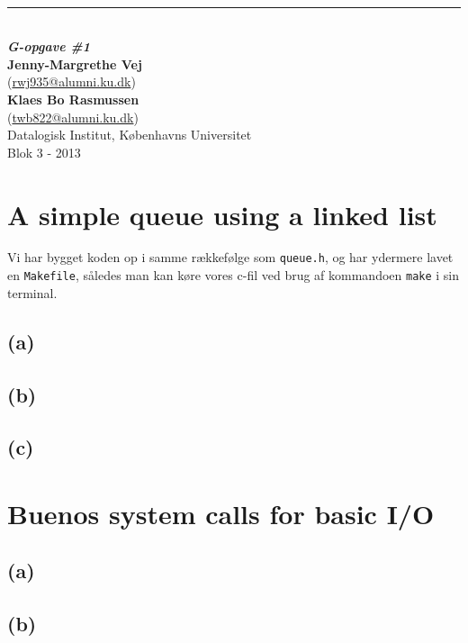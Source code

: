 \thispagestyle{empty}
\begin{flushright}
   {\Huge\textbf{\@title}}\\[3mm]
   \rule{\linewidth}{2mm}\\[3mm]
   {\Large\textbf{\textit{G-opgave \#1}}}\\
   \vspace{12cm}
   {\normalsize \textbf{Jenny-Margrethe Vej}
   \\(\url{rwj935@alumni.ku.dk})}
   \\
   {\normalsize \textbf{Klaes Bo Rasmussen}
   \\(\url{twb822@alumni.ku.dk})}
   \\
	\vspace*{2cm}
   {\normalsize Datalogisk Institut, Københavns Universitet}\\
   {\normalsize Blok 3 - 2013}\\
\end{flushright}
\clearpage

\section*{A simple queue using a linked list}
Vi har bygget koden op i samme rækkefølge som \verb+queue.h+, og har ydermere lavet en 
\verb+Makefile+, således man kan køre vores c-fil ved brug af kommandoen \verb+make+ i sin terminal.
\subsection*{(a)}

\subsection*{(b)}

\subsection*{(c)}

\section*{Buenos system calls for basic I/O}
\subsection*{(a)}

\subsection*{(b)}


\thispagestyle{empty}
\clearpage
\renewcommand{\labelitemi}{$\cdot$}




